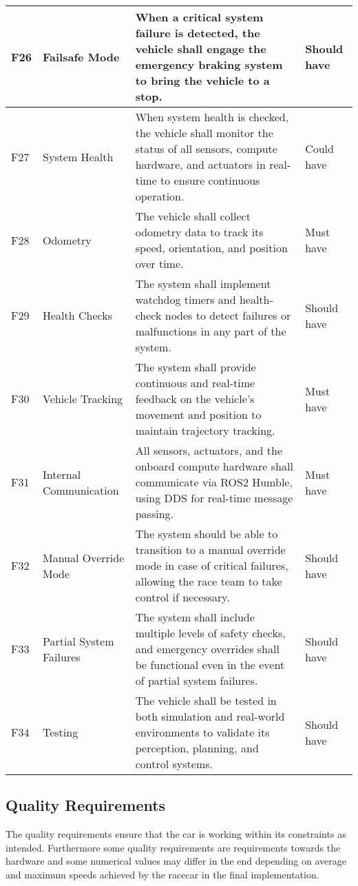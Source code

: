 \begin{center}
\begin{longtable}{ | m{2em} | m{10em} | m{16em} | m{8em} | }
		\hline
		F26 & Failsafe Mode & When a critical system failure is detected, the vehicle shall engage the emergency braking system to bring the vehicle to a stop. & Should have\\
		\hline
		F27 & System Health & When system health is checked, the vehicle shall monitor the status of all sensors, compute hardware, and actuators in real-time to ensure continuous operation. & Could have \\
		\hline
		F28 & Odometry & The vehicle shall collect odometry data to track its speed, orientation, and position over time. & Must have\\
		\hline
		F29 & Health Checks & The system shall implement watchdog timers and health-check nodes to detect failures or malfunctions in any part of the system. & Should have\\
		\hline
		F30 & Vehicle Tracking & The system shall provide continuous and real-time feedback on the vehicle's movement and position to maintain trajectory tracking. & Must have \\
		\hline
		F31 & Internal Communication & All sensors, actuators, and the onboard compute hardware shall communicate via ROS2 Humble, using DDS for real-time message passing. & Must have\\
		\hline
		F32 & Manual Override Mode & The system should be able to transition to a manual override mode in case of critical failures, allowing the race team to take control if necessary. & Should have\\
		\hline
		F33 & Partial System Failures & The system shall include multiple levels of safety checks, and emergency overrides shall be functional even in the event of partial system failures. & Should have\\
		\hline
		F34 & Testing & The vehicle shall be tested in both simulation and real-world environments to validate its perception, planning, and control systems. & Should have \\
		\hline
	\end{longtable}
\end{center}

\subsection{Quality Requirements}

The quality requirements ensure that the car is working within its constraints as intended. Furthermore some quality requirements are requirements towards the hardware and some numerical values may differ in the end depending on average and maximum speeds achieved by the racecar in the final implementation.

